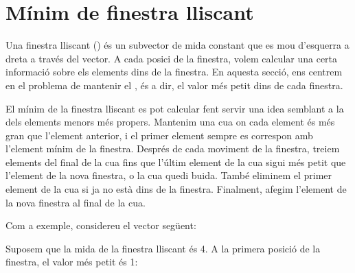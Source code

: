 \section{Mínim de finestra lliscant}

 

Una finestra lliscant () és un subvector de mida
constant que es mou d'esquerra a dreta a través del vector. A cada
posici de la finestra, volem calcular una certa informació sobre els
elements dins de la finestra. En aquesta secció, ens centrem en el
problema de mantenir el , és a dir, el valor
més petit dins de cada finestra.

El mínim de la finestra lliscant es pot calcular fent servir una idea
semblant a la dels elements menors més propers. Mantenim una cua on
cada element és més gran que l'element anterior, i el primer element
sempre es correspon amb l'element mínim de la finestra. Després de
cada moviment de la finestra, treiem elements del final de la cua fins
que l'últim element de la cua sigui més petit que l'element de la
nova finestra, o la cua quedi buida. També eliminem el primer element
de la cua si ja no està dins de la finestra. Finalment, afegim l'element
de la nova finestra al final de la cua.

Com a exemple, considereu el vector següent:


\begin{center}
\end{center}


Suposem que la mida de la finestra lliscant és 4. A la primera posició
de la finestra, el valor més petit és 1:
\begin{center}
\end{center}


